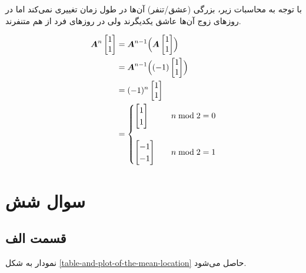 \documentclass[14pt,a4]{article}
\begin{document}
با توجه به محاسبات زیر، بزرگی (عشق/تنفر) آن‌ها در طول زمان تغییری نمی‌کند اما در روز‌های زوج
آن‌ها عاشق یکدیگرند ولی در روز‌های فرد از هم متنفرند.

\begin{align*}
    \boldsymbol{A}^n \begin{bmatrix} 1 \\ 1 \end{bmatrix} & = \boldsymbol{A}^{n-1} \Bigl(\boldsymbol{A}\begin{bmatrix} 1 \\ 1 \end{bmatrix}\Bigr) \\
     & = \boldsymbol{A}^{n-1} \Bigl((-1)\begin{bmatrix} 1 \\ 1 \end{bmatrix}\Bigr) \\
     & = (-1)^{n}\begin{bmatrix} 1 \\ 1 \end{bmatrix} \\
     & = \begin{cases}
            \begin{bmatrix} 1 \\ 1 \end{bmatrix} &\quad n \; \text{mod} \; 2 = 0\\
            \\
            \begin{bmatrix} -1 \\ -1 \end{bmatrix} &\quad n \; \text{mod} \; 2 = 1\\
        \end{cases}
\end{align*}

\section*{سوال شش}

\subsection*{قسمت الف}

نمودار به شکل \ref{table-and-plot-of-the-mean-location} حاصل می‌شود.
\end{document}
